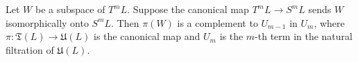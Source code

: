 Let $W$ be a subspace of $T^m L$. Suppose the canonical map $T^m L \to S^m L$ sends $W$ isomorphically onto $S^m L$. Then $\pi(W)$ is a complement to $U_{m-1}$ in $U_m$, where $\pi: \mathfrak{T}(L) \to \mathfrak{U}(L)$ is the canonical map and $U_m$ is the $m$-th term in the natural filtration of $\mathfrak{U}(L)$.
